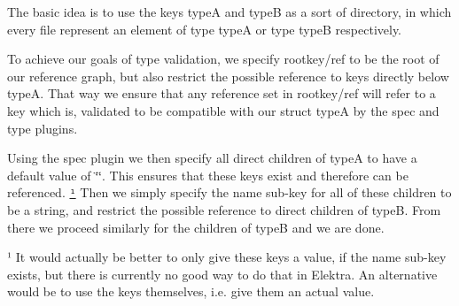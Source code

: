 The basic idea is to use the keys {\ttfamily typeA} and {\ttfamily typeB} as a sort of \textquotesingle{}directory\textquotesingle{}, in which every \textquotesingle{}file\textquotesingle{} represent an element of type {\ttfamily typeA} or type {\ttfamily typeB} respectively.

To achieve our goals of type validation, we specify {\ttfamily rootkey/ref} to be the root of our reference graph, but also restrict the possible reference to keys directly below {\ttfamily typeA}. That way we ensure that any reference set in {\ttfamily rootkey/ref} will refer to a key which is, validated to be compatible with our {\ttfamily struct typeA} by the spec and type plugins.

Using the spec plugin we then specify all direct children of {\ttfamily typeA} to have a default value of {\ttfamily \char`\"{}\char`\"{}}. This ensures that these keys exist and therefore can be referenced. \href{#note-empty-val}{\tt ¹} Then we simply specify the {\ttfamily name} sub-\/key for all of these children to be a string, and restrict the possible reference to direct children of {\ttfamily typeB}. From there we proceed similarly for the children of {\ttfamily typeB} and we are done.



 ¹ It would actually be better to only give these keys a value, if the {\ttfamily name} sub-\/key exists, but there is currently no good way to do that in Elektra. An alternative would be to use the keys themselves, i.\+e. give them an actual value. 